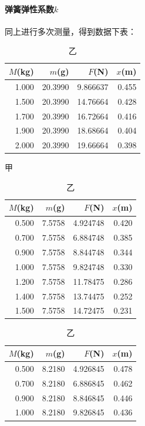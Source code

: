 \documentclass[a4paper,zihao=5,UTF8,fontset=fandol]{../phyreport}
\begin{document}
\paragraph{弹簧弹性系数$k$}
同上进行多次测量，得到数据下表：
\begin{table}[H]
	\centering
	\begin{subtable}{0.4\textwidth}
	\centering
		\begin{tabular}{rrrr}
			\toprule
			$M$(kg) & $m$(g) & $F$(N) & $x$(m) \\
			\midrule
			1.000  & 20.3990  & 9.866637 & 0.455  \\
			1.500  & 20.3990  & 14.76664 & 0.428  \\
			1.700  & 20.3990  & 16.72664 & 0.416  \\
			1.900  & 20.3990  & 18.68664 & 0.404  \\
			2.000  & 20.3990  & 19.66664 & 0.398  \\
			\bottomrule
		\end{tabular}
		\caption{甲}
	\end{subtable}
	\begin{subtable}[b]{0.4\textwidth}
		\centering
		\begin{tabular}{rrrr}
			\toprule
			$M$(kg) & $m$(g) & $F$(N) & $x$(m) \\
			\midrule
			0.500  & 7.5758  & 4.924748 & 0.420  \\
			0.700  & 7.5758  & 6.884748 & 0.385  \\
			0.900  & 7.5758  & 8.844748 & 0.344  \\
			1.000  & 7.5758  & 9.824748 & 0.330  \\
			1.200  & 7.5758  & 11.78475 & 0.286  \\
			1.400  & 7.5758  & 13.74475 & 0.252  \\
			1.500  & 7.5758  & 14.72475 & 0.231  \\
			\bottomrule
		\end{tabular}
		\caption{乙}
	\end{subtable}
	\begin{subtable}[b]{0.4\textwidth}
		\centering
		\begin{tabular}{rrrr}
			\toprule
			$M$(kg) & $m$(g) & $F$(N) & $x$(m) \\
			\midrule
			0.500  & 8.2180  & 4.926845 & 0.478  \\
			0.700  & 8.2180  & 6.886845 & 0.462  \\
			0.900  & 8.2180  & 8.846845 & 0.446  \\
			1.000  & 8.2180  & 9.826845 & 0.436  \\

\end{tabular}
\end{subtable}
\end{table}
\end{document}
